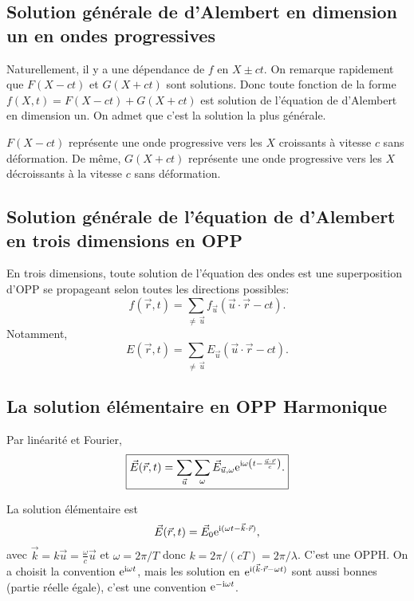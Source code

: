 \subsection{Solution générale de d'Alembert en dimension un en ondes progressives}

Naturellement, il y a une dépendance de $f$ en $X\pm ct$. On remarque rapidement que $F(X-ct)$ et $G(X+ct)$ sont solutions. Donc toute fonction de la forme $f(X,t)=F(X-ct)+G(X+ct)$ est solution de l'équation de d'Alembert en dimension un. On admet que c'est la solution la plus générale.

$F(X-ct)$ représente une onde progressive vers les $X$ croissants à vitesse $c$ sans déformation. De même, $G(X+ct)$ représente une onde progressive vers les $X$ décroissants à la vitesse $c$ sans déformation.

\subsection{Solution générale de l'équation de d'Alembert en trois dimensions en OPP}

En trois dimensions, toute solution de l'équation des ondes est une superposition d'OPP se propageant selon toutes les directions possibles:
\begin{equation}
    \boxed{
        f(\vec{r},t)=\sum_{\neq\,\vec{u}}f_{\vec{u}}(\vec{u}\cdot\vec{r}-ct).
    }
\end{equation}
Notamment, 
\begin{equation}
    \boxed{
        E(\vec{r},t)=\sum_{\neq\,\vec{u}}E_{\vec{u}}(\vec{u}\cdot\vec{r}-ct).
    }
\end{equation}

\subsection{La solution élémentaire en OPP Harmonique}

Par linéarité et Fourier, 
\begin{equation}
    \boxed{
        \vec{E}(\vec{r},t)=\sum_{\vec{u}}\sum_{\omega}\vec{E}_{\vec{u},\omega}\mathrm{e}^{\mathrm{i}\omega\left(t-\frac{\vec{u}\cdot\vec{r}}{c}\right)}.
    }
\end{equation}

La solution élémentaire est
\begin{equation}
    \vec{E}(\vec{r},t)=\vec{E}_{0}\mathrm{e}^{\mathrm{i}(\omega t-\vec{k}\cdot\vec{r})},
\end{equation}
avec $\vec{k}=k\vec{u}=\frac{\omega}{c}\vec{u}$ et $\omega=2\pi/T$ donc $k=2\pi/(cT)=2\pi / \lambda$. C'est une OPPH. On a choisit la convention $\mathrm{e}^{\mathrm{i}\omega t}$, mais les solution en $\mathrm{e}^{\mathrm{i}(\vec{k}\cdot\vec{r}-\omega t)}$ sont aussi bonnes (partie réelle égale), c'est une convention $\mathrm{e}^{-\mathrm{i}\omega t}$.

